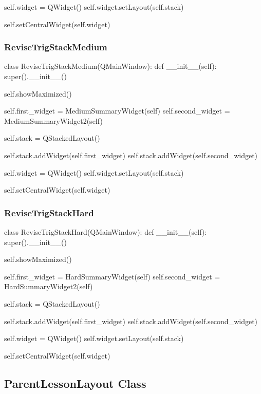 \begin{landscape}
\begin{python}
        self.widget = QWidget()
        self.widget.setLayout(self.stack)

        self.setCentralWidget(self.widget)
\end{python}

\subsubsection{ReviseTrigStackMedium}

\begin{python}
class ReviseTrigStackMedium(QMainWindow):
    def __init__(self):
        super().__init__()

        self.showMaximized()

        self.first_widget = MediumSummaryWidget(self)
        self.second_widget = MediumSummaryWidget2(self)

        self.stack = QStackedLayout()

        self.stack.addWidget(self.first_widget)
        self.stack.addWidget(self.second_widget)

        self.widget = QWidget()
        self.widget.setLayout(self.stack)

        self.setCentralWidget(self.widget)
\end{python}

\subsubsection{ReviseTrigStackHard}

\begin{python}
class ReviseTrigStackHard(QMainWindow):
    def __init__(self):
        super().__init__()

        self.showMaximized()

        self.first_widget = HardSummaryWidget(self)
        self.second_widget = HardSummaryWidget2(self)

        self.stack = QStackedLayout()

        self.stack.addWidget(self.first_widget)
        self.stack.addWidget(self.second_widget)

        self.widget = QWidget()
        self.widget.setLayout(self.stack)

        self.setCentralWidget(self.widget)
\end{python}

\subsection{ParentLessonLayout Class}


\end{landscape}
